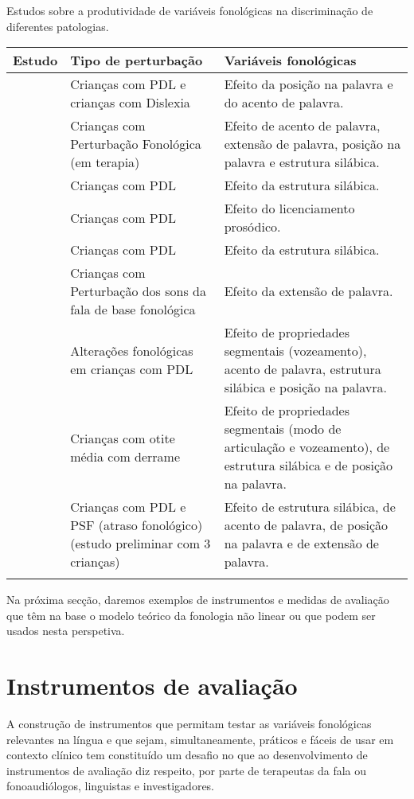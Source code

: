 \documentclass[output=paper,colorlinks,citecolor=brown,booklanguage=portuguese]{langscibook}
\begin{document}
\begin{Tabela}
\caption{Estudos sobre a produtividade de variáveis fonológicas na discriminação de diferentes patologias.}
\label{tab:cap6tab6}


\begin{tabularx}{\textwidth}{p{2.1cm}p{3.6cm}Q}
\lsptoprule
\textbf{Estudo} & \textbf{Tipo de perturbação} & \textbf{Variáveis fonológicas}\\
\midrule
\citet{Marshall2009} & Crianças com PDL e {crianças} com Dislexia &  Efeito da posição na palavra e do acento de palavra.\\
\tablevspace
\citet{BlancoDutra2009} & Crianças com {Perturbação} Fonológica (em terapia) & Efeito de acento de palavra, {extensão} de palavra, posição na palavra e estrutura silábica.\\
\tablevspace
\citet{Tamburelli2013} & Crianças com PDL & Efeito da estrutura silábica.\\
\tablevspace
\citet{Demuth2014} & Crianças com PDL & Efeito do licenciamento prosódico.\\
\tablevspace
\citet{Ferre2015} & Crianças com PDL & Efeito da estrutura silábica.\\
\tablevspace
\citet{Masso2017} & Crianças com {Perturbação} dos sons da fala de base fonológica & Efeito da extensão de palavra.\\
\tablevspace
\citet{Lousada2012a} & Alterações fonológicas em crianças com PDL  & Efeito de propriedades {segmentais} (vozeamento), acento de palavra, estrutura silábica e posição na palavra.\\
\tablevspace
\citet{Baptista2015} & Crianças com otite {média} com derrame & Efeito de propriedades {segmentais} (modo de articulação e vozeamento), de estrutura silábica e de posição na palavra.\\
\tablevspace
\citet{Ramalho2017a} & Crianças com PDL e PSF (atraso fonológico) ({estudo} preliminar com 3 crianças) & Efeito de estrutura silábica, de acento de palavra, de posição na palavra e de extensão de palavra.\\
\lspbottomrule
\end{tabularx}
\end{Tabela}


Na próxima secção, daremos exemplos de instrumentos e medidas de avaliação que têm na base o modelo teórico da fonologia não linear ou que podem ser usados nesta perspetiva.

\section{Instrumentos de avaliação}\label{sec:cap6sec2}
A construção de instrumentos que permitam testar as variáveis fonológicas relevantes na língua e que sejam, simultaneamente, práticos e fáceis de usar em contexto clínico tem constituído um desafio no que ao desenvolvimento de instrumentos de avaliação diz respeito, por parte de terapeutas da fala ou fonoaudiólogos, linguistas e investigadores. 
\end{document}
